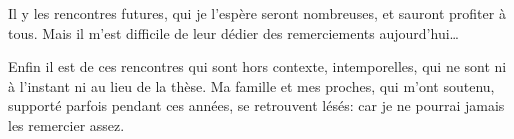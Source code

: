 Il y les rencontres futures, qui je l'espère seront nombreuses, et sauront profiter à tous.
Mais il m'est difficile de leur dédier des remerciements aujourd'hui…

Enfin il est de ces rencontres qui sont hors contexte, intemporelles, qui ne sont ni à l'instant ni au lieu de la thèse.
Ma famille et mes proches, qui m'ont soutenu, supporté parfois pendant ces années, se retrouvent lésés: car je ne pourrai jamais les remercier assez.
